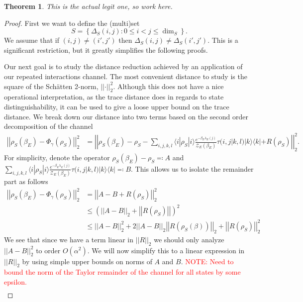 \documentclass{article}
\newtheorem{theorem}{Theorem}
\newcommand{\ket}[1]{|#1\rangle}
\newcommand{\bra}[1]{\langle #1|}
\newcommand{\ketbra}[2]{| #1\rangle\! \langle #2|}
\newcommand{\parens}[1]{\left( #1 \right)}
\newcommand{\norm}[1]{\left| \left| #1 \right| \right|}
\newcommand{\set}[1]{\left\{ #1 \right\}}
\newcommand{\bigo}[1]{O\left( #1 \right)}
\newcommand{\partfun}{\mathcal{Z}}
\begin{document}
\begin{theorem}
    This is the actual legit one, so work here. 
\end{theorem}
\begin{proof}
    First we want to define the (multi)set
    \begin{equation}
        S = \set{\Delta_S(i,j) : 0 \leq i < j \leq \dim_S}.
    \end{equation}
    We assume that if $(i,j) \neq (i', j')$ then $\Delta_S(i,j) \neq \Delta_S(i', j')$. This is a significant restriction, but it greatly simplifies the following proofs. 
    
    Our next goal is to study the distance reduction achieved by an application of our repeated interactions channel. The most convenient distance to study is the square of the Sch\"{a}tten 2-norm, $\norm{\cdot}_2^2$. Although this does not have a nice operational interpretation, as the trace distance does in regards to state distinguishability, it can be used to give a loose upper bound on the trace distance. We break down our distance into two terms based on the second order decomposition of the channel
\begin{align}
    \norm{\rho_S(\beta_E) - \Phi_{\gamma}(\rho_S)}_2^2 &= \norm{\rho_S(\beta_E) - \rho_S - \sum_{i, j, k, l} \bra{i} \rho_S \ket{i} \frac{e^{-\beta_E \lambda_E(j)}}{\partfun_E(\beta_E)}   \tau(i, j| k,l) \ketbra{k}{k} + R(\rho_S)}_2^2.
\end{align}
For simplicity, denote the operator $\rho_S(\beta_E) - \rho_S \eqqcolon A$ and $\sum_{i, j, k, l} \bra{i} \rho_S \ket{i} \frac{e^{-\beta_E \lambda_E(j)}}{\partfun_E(\beta_E)} \tau(i, j| k,l) \ketbra{k}{k} \eqqcolon B$. This allows us to isolate the remainder part as follows
\begin{align}
    \norm{\rho_S(\beta_E) - \Phi_\gamma(\rho_S)}_2^2 &= \norm{A - B + R(\rho_S)}_2^2 \\
    &\leq \parens{\norm{A - B}_2 + \norm{R(\rho_S)}}^2 \\
    &\leq \norm{A - B}_2^2 + 2 \norm{A - B}_2 \norm{R(\rho_S(\beta))}_2 + \norm{R(\rho_S)}_2^2
\end{align}
We see that since we have a term linear in $\norm{R}_2$ we should only analyze $\norm{A - B}_2^2$ to order $\bigo{\alpha^2}$. We will now simplify this to a linear expression in $\norm{R}_2$ by using simple upper bounds on norms of $A$ and $B$. \textcolor{red}{NOTE: Need to bound the norm of the Taylor remainder of the channel for all states by some epsilon.} 
\begin{align}

\end{align}
\end{proof}
\end{document}
